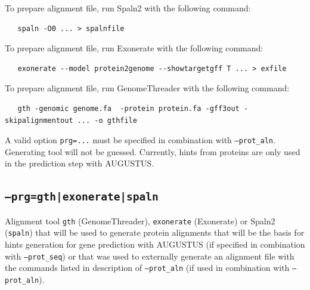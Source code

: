 \documentclass[a4paper,10pt]{report}
\begin{document}
                                         To prepare alignment file, run Spaln2 with the following command:
                                         
                                         \begin{verbatim}
   spaln -O0 ... > spalnfile
                                            \end{verbatim}
                                            
                                         To prepare alignment file, run Exonerate with the following command:
                                         
                                         \begin{verbatim}
   exonerate --model protein2genome --showtargetgff T ... > exfile
                                            \end{verbatim}
                                            
                                         To prepare alignment file, run GenomeThreader with the following command:
                                         
                                         \begin{verbatim}
   gth -genomic genome.fa  -protein protein.fa -gff3out -skipalignmentout ... -o gthfile
                                         \end{verbatim}
                                         
                                         A valid option \texttt{prg=...} must be specified in combination with 
                                         \texttt{--prot\_aln}. Generating tool will not be guessed.
                                         Currently, hints from proteins are only used in the prediction step with
                                         AUGUSTUS.
    \subsection{\texttt{--prg=gth|exonerate|spaln}}            Alignment tool \texttt{gth} (GenomeThreader), \texttt{exonerate} (Exonerate) or Spaln2
                                         (\texttt{spaln}) that will be used to generate protein alignments that will be the 
                                         basis for hints generation for gene prediction with AUGUSTUS (if specified
                                         in combination with \texttt{--prot\_seq}) or that was used to externally
                                         generate an alignment file with the commands listed in description of 
                                         \texttt{--prot\_aln} (if used in combination with \texttt{--prot\_aln}).
\end{document}
